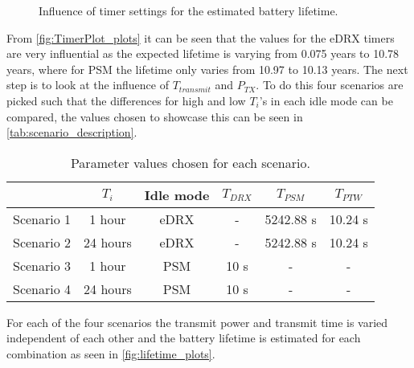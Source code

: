 \begin{figure}[H]
\centering
\begin{minipage}{0.48\textwidth}
\resizebox{\textwidth}{!}{
}
\end{minipage}
\hfill
\begin{minipage}{0.48\textwidth}
\resizebox{\textwidth}{!}{
}
\end{minipage}
\caption{Influence of timer settings for the estimated battery lifetime.}
\label{fig:TimerPlot_plots}
\end{figure}

From \autoref{fig:TimerPlot_plots} it can be seen that the values for the eDRX timers are very influential as the expected lifetime is varying  from 0.075 years to 10.78 years, where for PSM the lifetime only varies from 10.97 to 10.13 years. The next step is to look at the influence of $T_{transmit}$ and $P_{TX}$. To do this four scenarios are picked such that the differences for high and low $T_i$'s in each idle mode can be compared, the values chosen to showcase this can be seen in \autoref{tab:scenario_description}.


\begin{table}[H]
\centering
\begin{tabular}{|c|c|c|c|c|c|} \hline
			& $T_i$ 		& Idle mode	& $T_{DRX}$	& $T_{PSM}$	& $T_{PTW}$	\\ \hline
Scenario 1	& 1 hour 	& eDRX 		& -			& 5242.88 s	& 10.24 s	\\ \hline
Scenario 2	& 24 hours 	& eDRX 		& -			& 5242.88 s	& 10.24 s	\\ \hline
Scenario 3	& 1 hour 	& PSM		& 10 s		& -			& -			\\ \hline
Scenario 4	& 24 hours 	& PSM		& 10 s		& -			& -			\\ \hline
\end{tabular}
\caption{Parameter values chosen for each scenario.}
\label{tab:scenario_description}
\end{table}

For each of the four scenarios the transmit power and transmit time is varied independent of each other and the battery lifetime is estimated for each combination as seen in \autoref{fig:lifetime_plots}.


